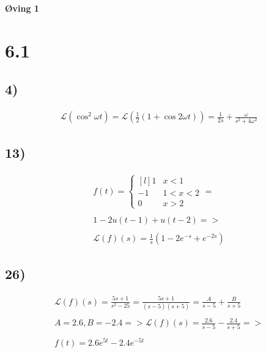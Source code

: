 \documentclass{article}
\newcommand{\paranth}[1]{\left( #1 \right)}
\newcommand{\laplace}[1]{\mathcal{L}\paranth{#1}}
\begin{document}
\begin{center}
    \LARGE{\textbf{Øving 1}}
\end{center}

\section*{\textbf{6.1}}

\subsection*{4)}

\begin{gather*}
    \laplace{\cos^2{\omega t}} =
    \laplace{\frac{1}{2}\paranth{1 + \cos{2\omega t}}} =
    \frac{1}{2 s} + \frac{\omega}{s^2 + 4\omega^2}
\end{gather*}


\subsection*{13)}

\begin{gather*}
    f(t) = \left\{ \begin{matrix*}[l]
        1   & x < 1     \\
        -1  & 1 < x < 2 \\
        0   & x > 2
    \end{matrix*} \right.
    = \\ \\
    1 - 2 u\paranth{t - 1} + u\paranth{t - 2} => \\ \\
    \laplace{f}\paranth{s} = \frac{1}{s} \paranth{1 - 2 e^{-s} + e^{-2 s}}
\end{gather*}


\subsection*{26)}

\begin{gather*}
	\laplace{f} \paranth{s} =
	\frac{5 s + 1}{s^2 - 25} =
	\frac{5 s + 1}{\paranth{s - 5}\paranth{s + 5}} =
	\frac{A}{s - 5} + \frac{B}{s + 5} \\ \\
	A = 2.6, B = -2.4 =>
	\laplace{f} \paranth{s} =
	\frac{2.6}{s - 5} - \frac{2.4}{s + 5} => \\ \\
	f\paranth{t} = 2.6 e^{5 t} - 2.4 e^{-5 t}
\end{gather*}
\end{document}
